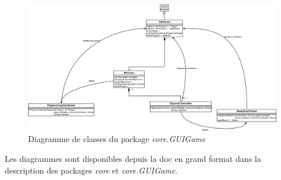 \documentclass[]{report}
\begin{document}
\begin{figure}[!h]
	\caption{Diagramme de classes du package \textit{core.GUIGame}}
	\includegraphics[width=\textwidth]{core_GUIGame.png}
\end{figure}

Les diagrammes sont disponibles depuis la doc en grand format dans la description des packages \textit{core} et \textit{core.GUIGame}.
\end{document}

